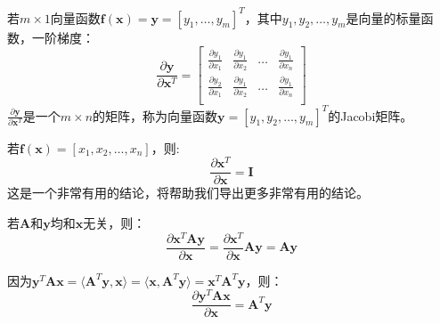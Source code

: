 \documentclass[10pt,a4paper,UTF8]{article}
\begin{document}
若\(m\times 1\)向量函数\(\mathbf{f}(\mathbf{x}) = \mathbf{y} = [y_{1},\ldots ,y_{m}]^{T}\)，其中\(y_{1},y_{2},\ldots ,y_{m}\)是向量的标量函数，一阶梯度：
\begin{equation}
\label{eq:6}
\frac{\partial \mathbf{y}}{\partial \mathbf{x}^{T}} =
\begin{bmatrix}
\frac{\partial y_{1}}{\partial x_{1}} & \frac{\partial y_{1}}{\partial x_{2}} & \ldots & \frac{\partial y_{1}}{\partial x_{n}} \\
\frac{\partial y_{2}}{\partial x_{1}} & \frac{\partial y_{1}}{\partial x_{2}} & \ldots & \frac{\partial y_{1}}{\partial x_{n}} \\
\end{bmatrix}
\end{equation}
\(\frac{\partial \mathbf{y}}{\partial \mathbf{x}^{T}}\)是一个\(m\times n\)的矩阵，称为向量函数\(\mathbf{y} = [y_{1},y_{2},\ldots ,y_{m}]^{T}\)的Jacobi矩阵。

若\(\mathbf{f}(\mathbf{x}) = [x_{1},x_{2},\ldots ,x_{n}]\)，则:
\begin{equation}
\label{eq:7}
\frac{\partial \mathbf{x}^{T}}{\partial \mathbf{x}} = \mathbf{I}
\end{equation}
这是一个非常有用的结论，将帮助我们导出更多非常有用的结论。

\begin{tikzinstance}


若\(\mathbf{A}\)和\(\mathbf{y}\)均和\(\mathbf{x}\)无关，则：
\begin{equation}
\label{eq:9}
\frac{\partial \mathbf{x}^{T}\mathbf{A}\mathbf{y}}{\partial \mathbf{x}} = \frac{\partial \mathbf{x}^{T}}{\partial \mathbf{x}}\mathbf{A}\mathbf{y} = \mathbf{A}\mathbf{y}
\end{equation}
\end{tikzinstance}

\begin{tikzinstance}


因为\(\mathbf{y}^{T}\mathbf{A}\mathbf{x} = \langle \mathbf{A}^{T}\mathbf{y},\mathbf{x} \rangle  = \langle \mathbf{x},\mathbf{A}^{T}\mathbf{y} \rangle = \mathbf{x}^{T}\mathbf{A}^{T} \mathbf{y}\)，则：
\begin{equation}
\label{eq:10}
\frac{\partial \mathbf{y}^{T}\mathbf{A}\mathbf{x}}{\partial \mathbf{x}} = \mathbf{A}^{T}\mathbf{y}
\end{equation}
\end{tikzinstance}
\end{document}
